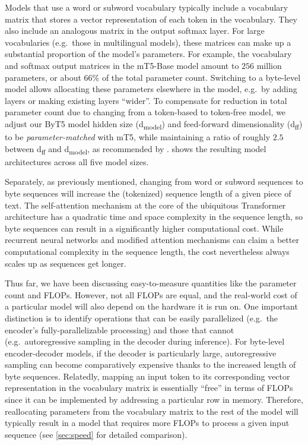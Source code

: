 \documentclass[11pt,a4paper]{article}
\begin{document}
Models that use a word or subword vocabulary typically include a vocabulary matrix that stores a vector representation of each token in the vocabulary.
They also include an analogous matrix in the output softmax layer.
For large vocabularies (e.g.\ those in multilingual models), these matrices can make up a substantial proportion of the model's parameters.
For example, the vocabulary and softmax output matrices in the \mbox{mT5-Base} model amount to $256$ million parameters, or about 66\% of the total parameter count.
Switching to a byte-level model allows allocating these parameters elsewhere in the model, e.g.\ by adding layers or making existing layers ``wider''.
To compensate for reduction in total parameter count due to changing from a token-based to token-free model, we adjust our ByT5 model hidden size (d\textsubscript{model}) and feed-forward dimensionality (d\textsubscript{ff}) to be \textit{parameter-matched} with mT5, while maintaining a ratio of roughly $2.5$ between d\textsubscript{ff} and d\textsubscript{model}, as recommended by \citet{kaplan2020scaling}.
 shows the resulting model architectures across all five model sizes.

Separately, as previously mentioned, changing from word or subword sequences to byte sequences will increase the (tokenized) sequence length of a given piece of text.
The self-attention mechanism at the core of the ubiquitous Transformer architecture \cite{vaswani2017attention} has a quadratic time and space complexity in the sequence length, so byte sequences can result in a significantly higher computational cost.
While recurrent neural networks and modified attention mechanisms \cite{tay2020efficient} can claim a better computational complexity in the sequence length, the cost nevertheless always scales up as sequences get longer.

Thus far, we have been discussing easy-to-measure quantities like the parameter count and FLOPs.
However, not all FLOPs are equal, and the real-world cost of a particular model will also depend on the hardware it is run on.
One important distinction is to identify operations that can be easily parallelized (e.g.\ the encoder's fully-parallelizable processing) and those that cannot (e.g.\ autoregressive sampling in the decoder during inference).
For byte-level encoder-decoder models, if the decoder is particularly large, autoregressive sampling can become comparatively expensive thanks to the increased length of byte sequences.
Relatedly, mapping an input token to its corresponding vector representation in the vocabulary matrix is essentially ``free'' in terms of FLOPs since it can be implemented by addressing a particular row in memory.
Therefore, reallocating parameters from the vocabulary matrix to the rest of the model will typically result in a model that requires more FLOPs to process a given input sequence (see \cref{sec:speed} for detailed comparison).
\end{document}
